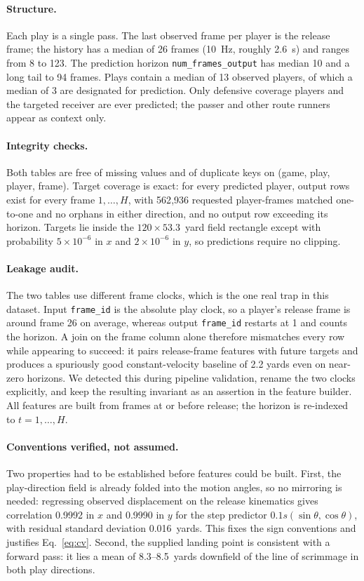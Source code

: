 \documentclass{article}
\begin{document}
\paragraph{Structure.}
Each play is a single pass. The last observed frame per player is the release frame;
the history has a median of 26 frames (10~Hz, roughly 2.6~s) and ranges from 8 to
123. The prediction horizon \texttt{num\_frames\_output} has median 10 and a long
tail to 94 frames. Plays contain a median of 13 observed players, of which a median
of 3 are designated for prediction. Only defensive coverage players and the targeted
receiver are ever predicted; the passer and other route runners appear as context
only.

\paragraph{Integrity checks.}
Both tables are free of missing values and of duplicate keys on (game, play, player,
frame). Target coverage is exact: for every predicted player, output rows exist for
every frame $1,\ldots,H$, with 562{,}936 requested player-frames matched one-to-one
and no orphans in either direction, and no output row exceeding its horizon. Targets
lie inside the $120\times 53.3$~yard field rectangle except with probability
$5\times 10^{-6}$ in $x$ and $2\times 10^{-6}$ in $y$, so predictions require no
clipping.

\paragraph{Leakage audit.}
The two tables use different frame clocks, which is the one real trap in this
dataset. Input \texttt{frame\_id} is the absolute play clock, so a player's release
frame is around frame 26 on average, whereas output \texttt{frame\_id} restarts at 1
and counts the horizon. A join on the frame column alone therefore mismatches every
row while appearing to succeed: it pairs release-frame features with future targets
and produces a spuriously good constant-velocity baseline of 2.2 yards even on
near-zero horizons. We detected this during pipeline validation, rename the two
clocks explicitly, and keep the resulting invariant as an assertion in the feature
builder. All features are built from frames at or before release; the horizon is
re-indexed to $t=1,\ldots,H$.

\paragraph{Conventions verified, not assumed.}
Two properties had to be established before features could be built. First, the
play-direction field is already folded into the motion angles, so no mirroring is
needed: regressing observed displacement on the release kinematics gives correlation
0.9992 in $x$ and 0.9990 in $y$ for the step predictor
$0.1s(\sin\theta,\cos\theta)$, with residual standard deviation 0.016~yards. This
fixes the sign conventions and justifies Eq.~\eqref{eq:cv}. Second, the supplied
landing point is consistent with a forward pass: it lies a mean of 8.3--8.5~yards
downfield of the line of scrimmage in both play directions.
\end{document}
